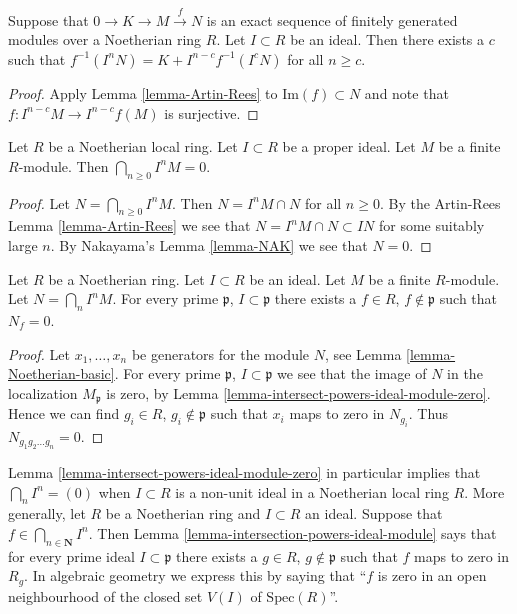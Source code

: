 \begin{lemma}
\label{lemma-map-AR}
Suppose that $0 \to K \to M \xrightarrow{f} N$ is an
exact sequence of finitely generated modules
over a Noetherian ring $R$. Let $I \subset R$ be an ideal.
Then there exists a $c$ such that $f^{-1}(I^nN)
= K + I^{n-c}f^{-1}(I^cN)$ for all $n \geq c$.
\end{lemma}

\begin{proof}
Apply Lemma \ref{lemma-Artin-Rees} to
$\text{Im}(f) \subset N$ and note that
$f : I^{n-c}M \to I^{n-c}f(M)$ is surjective.
\end{proof}

\begin{lemma}
\label{lemma-intersect-powers-ideal-module-zero}
Let $R$ be a Noetherian local ring. Let $I \subset R$ be
a proper ideal. Let $M$ be a finite $R$-module.
Then $\bigcap_{n \geq 0} I^nM = 0$.
\end{lemma}

\begin{proof}
Let $N = \bigcap_{n \geq 0} I^nM$.
Then $N = I^nM \cap N$ for all $n \geq 0$.
By the Artin-Rees Lemma \ref{lemma-Artin-Rees}
we see that $N = I^nM \cap N \subset IN$ for
some suitably large $n$. By Nakayama's Lemma \ref{lemma-NAK}
we see that $N = 0$.
\end{proof}

\begin{lemma}
\label{lemma-intersection-powers-ideal-module}
Let $R$ be a Noetherian ring.
Let $I \subset R$ be an ideal.
Let $M$ be a finite $R$-module.
Let $N = \bigcap_n I^n M$. 
For every prime $\mathfrak p$,
$I \subset \mathfrak p$ there
exists a $f \in R$, $f \not \in \mathfrak p$
such that $N_f = 0$.
\end{lemma}

\begin{proof}
Let $x_1,\ldots, x_n$ be generators for the module $N$,
see Lemma \ref{lemma-Noetherian-basic}. For every prime
$\mathfrak p$, $I \subset \mathfrak p$ we see that
the image of $N$ in the localization $M_{\mathfrak p}$
is zero, by Lemma \ref{lemma-intersect-powers-ideal-module-zero}.
Hence we can find $g_i \in R$, $g_i \not \in \mathfrak p$
such that $x_i$ maps to zero in $N_{g_i}$. Thus
$N_{g_1g_2\ldots g_n} = 0$.
\end{proof}

\begin{remark}
\label{remark-intersection-powers-ideal}
Lemma \ref{lemma-intersect-powers-ideal-module-zero} 
in particular implies that $\bigcap_n I^n = (0)$
when $I \subset R$ is a non-unit ideal in a Noetherian
local ring $R$. More generally, let $R$ be a Noetherian ring and
$I \subset R$ an ideal. Suppose that $f \in \bigcap_{n \in \mathbf{N}} I^n$.
Then Lemma \ref{lemma-intersection-powers-ideal-module}
says that for every prime ideal $I \subset \mathfrak p$
there exists a $g \in R$, $g \not \in \mathfrak p$
such that $f$ maps to zero in $R_g$. In algebraic geometry we
express this by saying that ``$f$ is zero in an open neighbourhood
of the closed set $V(I)$ of $\text{Spec}(R)$''.
\end{remark}

